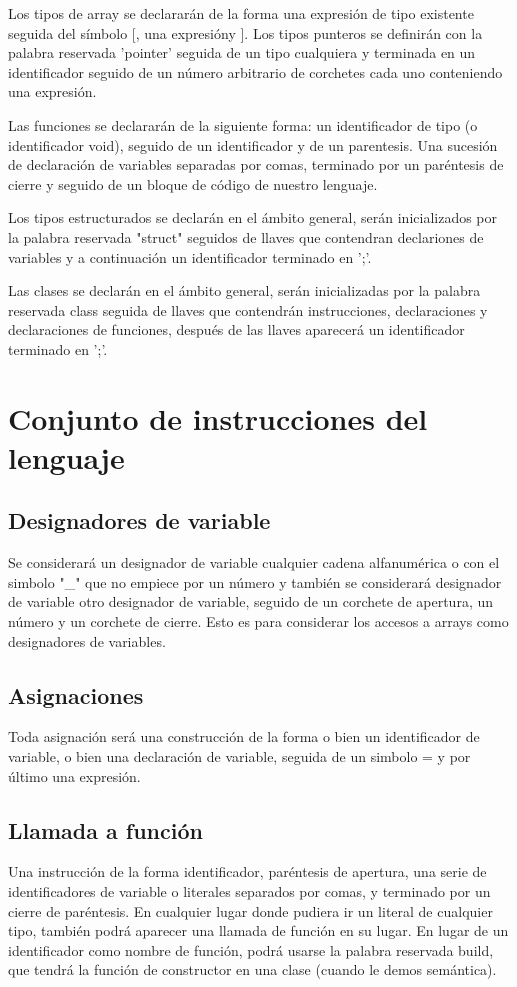 \documentclass{article}
\begin{document}
\noindent Los tipos de array se declararán de la forma una expresión de tipo existente seguida del símbolo [, una expresión\footnotemark[1] y ]. Los tipos punteros se definirán con la palabra reservada 'pointer' seguida de un tipo cualquiera y terminada en un identificador seguido de un número arbitrario de corchetes cada uno conteniendo una expresión.

\noindent Las funciones se declararán de la siguiente forma: un identificador de tipo (o identificador void), seguido de un identificador y de un parentesis. Una sucesión de declaración de variables separadas por comas, terminado por un paréntesis de cierre y seguido de un bloque de código de nuestro lenguaje.

\noindent Los tipos estructurados se declarán en el ámbito general, serán inicializados por la palabra reservada "struct"  seguidos de llaves que contendran declariones de variables y a continuación un identificador terminado en ';'.

\noindent Las clases se declarán en el ámbito general, serán inicializadas por la palabra reservada class seguida de llaves que contendrán instrucciones, declaraciones y declaraciones de funciones, después de las llaves aparecerá un identificador terminado en ';'.

\section{Conjunto de instrucciones del lenguaje}

\subsection{Designadores de variable}
Se considerará un designador de variable cualquier cadena alfanumérica o con el simbolo "\_" que no empiece por un número y también se considerará designador de variable otro designador de variable, seguido de un corchete de apertura, un número y un corchete de cierre. Esto es para considerar los accesos a arrays como designadores de variables.

\subsection{Asignaciones}
Toda asignación será una construcción de la forma o bien un identificador de variable, o bien una declaración de variable, seguida de un simbolo = y por último una expresión.

\subsection{Llamada a función}
Una instrucción de la forma identificador, paréntesis de apertura, una serie de identificadores de variable o literales separados por comas, y terminado por un cierre de paréntesis.
En cualquier lugar donde pudiera ir un literal de cualquier tipo, también podrá aparecer una llamada de función en su lugar. En lugar de un identificador como nombre de función, podrá usarse la palabra reservada build, que tendrá la función de constructor en una clase (cuando le demos semántica).
\end{document}
